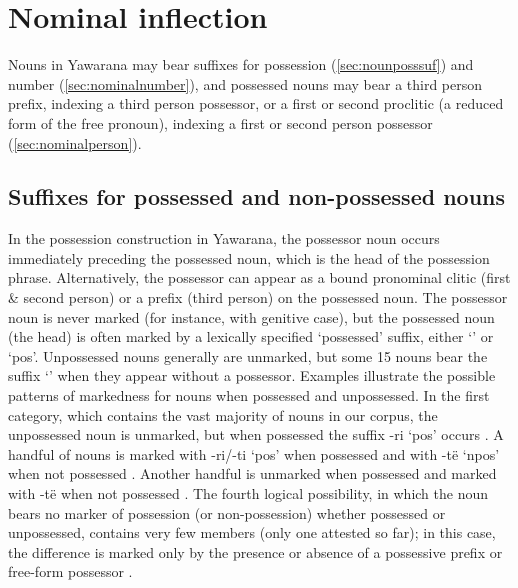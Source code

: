 \documentclass{memoir}
\begin{document}
\section{\texorpdfstring{Nominal inflection
\label{sec:nouninfl}}{Nominal inflection }}

Nouns in Yawarana may bear suffixes for possession
(\cref{sec:nounposssuf}) and number (\cref{sec:nominalnumber}), and
possessed nouns may bear a third person prefix, indexing a third person
possessor, or a first or second proclitic (a reduced form of the free
pronoun), indexing a first or second person possessor
(\cref{sec:nominalperson}).

\subsection{\texorpdfstring{Suffixes for possessed and non-possessed
nouns
\label{sec:nounposssuf}}{Suffixes for possessed and non-possessed nouns }}

In the possession construction in Yawarana, the possessor noun occurs
immediately preceding the possessed noun, which is the head of the
possession phrase. Alternatively, the possessor can appear as a bound
pronominal clitic (first \& second person) or a prefix (third person) on
the possessed noun. The possessor noun is never marked (for instance,
with genitive case), but the possessed noun (the head) is often marked
by a lexically specified `possessed' suffix, either 
`' or  `pos'. Unpossessed nouns generally are
unmarked, but some 15 nouns bear the suffix  `' when
they appear without a possessor. Examples
 illustrate the possible
patterns of markedness for nouns when possessed and unpossessed. In the
first category, which contains the vast majority of nouns in our corpus,
the unpossessed noun is unmarked, but when possessed the suffix -ri
`pos' occurs . A handful of nouns is marked with
-ri/-ti `pos' when possessed and with -të `npos' when not possessed
. Another handful is unmarked when possessed and
marked with -të when not possessed . The fourth
logical possibility, in which the noun bears no marker of possession (or
non-possession) whether possessed or unpossessed, contains very few
members (only one attested so far); in this case, the difference is
marked only by the presence or absence of a possessive prefix or
free-form possessor .
\end{document}
